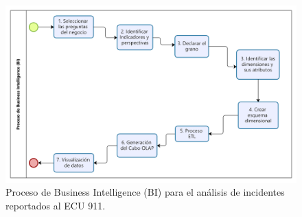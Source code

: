 \begin{figure}[H]
    \centering
    \includegraphics[width=1\textwidth]{chapters/III-resultados-y-discusion/resources/images/proceso-bi.png}
    \caption{Proceso de Business Intelligence (BI) para el análisis de incidentes reportados al ECU 911.}
    \label{fig:proceso-bi}
\end{figure}